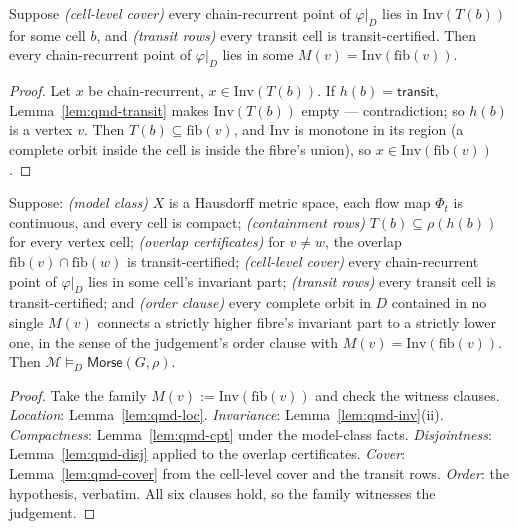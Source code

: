 \begin{blemma}
\label{lem:qmd-cover}
Suppose \emph{(cell-level cover)} every chain-recurrent point of
$\varphi|_D$ lies in $\mathrm{Inv}(T(b))$ for some cell $b$, and
\emph{(transit rows)} every transit cell is transit-certified. Then
every chain-recurrent point of $\varphi|_D$ lies in some
$M(v) = \mathrm{Inv}(\mathrm{fib}(v))$.
\end{blemma}
\begin{proof}
Let $x$ be chain-recurrent, $x \in \mathrm{Inv}(T(b))$. If $h(b) =
\mathsf{transit}$, Lemma~\ref{lem:qmd-transit} makes
$\mathrm{Inv}(T(b))$ empty --- contradiction; so $h(b)$ is a vertex
$v$. Then $T(b) \subseteq \mathrm{fib}(v)$, and $\mathrm{Inv}$ is
monotone in its region (a complete orbit inside the cell is inside the
fibre's union), so $x \in \mathrm{Inv}(\mathrm{fib}(v))$.
\end{proof}

\begin{bthm}\label{thm:qmd-sound}
Suppose:
\emph{(model class)} $X$ is a Hausdorff metric space, each flow map
$\Phi_t$ is continuous, and every cell is compact;
\emph{(containment rows)} $T(b) \subseteq \rho(h(b))$ for every vertex
cell;
\emph{(overlap certificates)} for $v \neq w$, the overlap
$\mathrm{fib}(v) \cap \mathrm{fib}(w)$ is transit-certified;
\emph{(cell-level cover)} every chain-recurrent point of $\varphi|_D$
lies in some cell's invariant part;
\emph{(transit rows)} every transit cell is transit-certified; and
\emph{(order clause)} every complete orbit in $D$ contained in no
single $M(v)$ connects a strictly higher fibre's invariant part to a
strictly lower one, in the sense of the judgement's order clause with
$M(v) = \mathrm{Inv}(\mathrm{fib}(v))$.
Then $\mathcal{M} \vDash_D \mathsf{Morse}(G, \rho)$.
\end{bthm}
\begin{proof}
Take the family $M(v) := \mathrm{Inv}(\mathrm{fib}(v))$ and check the
witness clauses. \emph{Location}: Lemma~\ref{lem:qmd-loc}.
\emph{Invariance}: Lemma~\ref{lem:qmd-inv}(ii). \emph{Compactness}:
Lemma~\ref{lem:qmd-cpt} under the model-class facts.
\emph{Disjointness}: Lemma~\ref{lem:qmd-disj} applied to the overlap
certificates. \emph{Cover}: Lemma~\ref{lem:qmd-cover} from the
cell-level cover and the transit rows. \emph{Order}: the hypothesis,
verbatim. All six clauses hold, so the family witnesses the judgement.
\end{proof}

